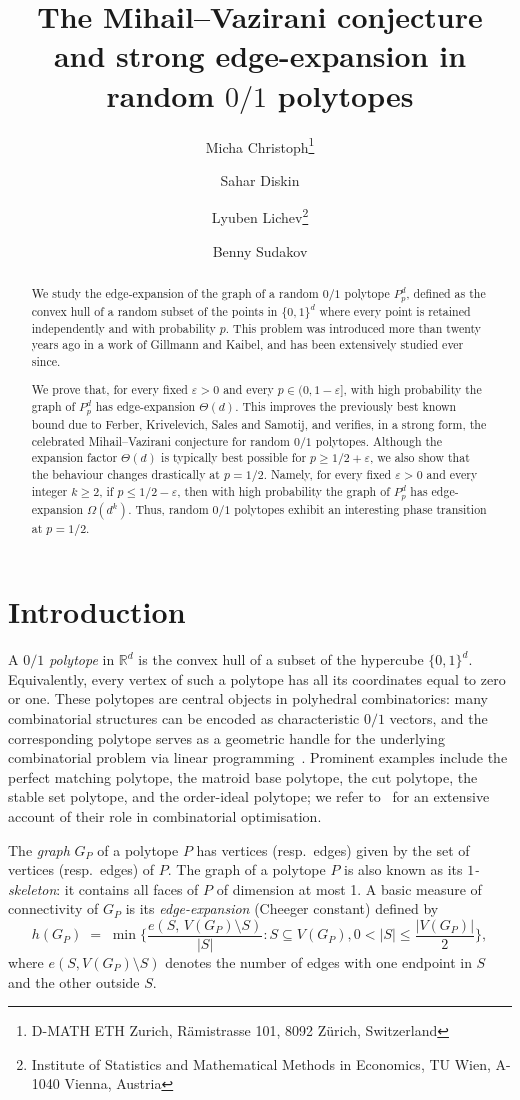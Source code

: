 \documentclass{article}
\title{The Mihail--Vazirani conjecture and strong edge-expansion in random $0/1$ polytopes}
\author{%
Micha Christoph\thanks{D-MATH ETH Zurich, R\"amistrasse 101, 8092 Z\"urich, Switzerland}
\and Sahar Diskin\footnotemark[1]
\and Lyuben Lichev\thanks{Institute of Statistics and Mathematical Methods in Economics, TU Wien, A-1040 Vienna, Austria}
\and Benny Sudakov\footnotemark[1]
}
\date{}
\theoremstyle{definition}
\newcommand{\eps}{\varepsilon}
\begin{document}
\maketitle

\begin{abstract}
We study the edge-expansion of the graph of a random $0/1$ polytope
$P^d_p$, defined as the convex hull of a random subset of the points in $\{0,1\}^d$ where every point is retained independently and with probability $p$.
This problem was introduced more than twenty years ago in a work of Gillmann and Kaibel, 
and has been extensively studied ever since.

We prove that, for every fixed $\eps>0$ and every $p\in(0,1-\eps]$, with high
probability the graph of $P^d_p$ has edge-expansion $\Theta(d)$. This improves the
previously best known bound due to Ferber, Krivelevich, Sales and Samotij, and
verifies, in a strong form, the celebrated Mihail--Vazirani conjecture for random
$0/1$ polytopes. Although the expansion factor $\Theta(d)$ is typically best
possible for $p\ge 1/2+\eps$, we also show that the behaviour changes drastically
at $p=1/2$. Namely, for every fixed $\eps>0$ and every integer $k\ge 2$, if
$p\le 1/2-\eps$, then with high probability the graph of $P^d_p$ has
edge-expansion $\Omega(d^k)$. Thus, random $0/1$ polytopes exhibit an interesting
phase transition at $p=1/2$.
\end{abstract}


\section{Introduction}
A \emph{$0/1$ polytope} in $\mathbb{R}^d$ is the convex hull of a subset of the
hypercube $\{0,1\}^d$.  Equivalently, every vertex of such a polytope has all
its coordinates equal to zero or one.  These polytopes are central objects in
polyhedral combinatorics: many combinatorial structures can be encoded as
characteristic $0/1$ vectors, and the corresponding polytope serves as a
geometric handle for the underlying combinatorial problem via linear
programming~\cite{Schrijver}.  Prominent examples include the perfect matching
polytope, the matroid base polytope, the cut polytope, the stable set polytope,
and the order-ideal polytope; we refer to~\cite{Schrijver} for an extensive
account of their role in combinatorial optimisation.
 
The \emph{graph} $G_P$ of a polytope $P$ has vertices (resp.\ edges) given by
the set of vertices (resp.\ edges) of $P$.
The graph of a polytope $P$ is also known as its \emph{$1$-skeleton}: it contains all faces of $P$ of dimension at most 1.
A basic measure of connectivity of $G_P$ is its
\emph{edge-expansion} (Cheeger constant) defined by 
\[
  h(G_P) \;=\; \min
  \bigg\{\frac{e(S,\, V(G_P)\setminus S)}{|S|}: S \subseteq V(G_P), 0 < |S| \le \frac{|V(G_P)|}{2}\bigg\},
\]
where $e(S, V(G_P)\setminus S)$ denotes the number of edges with one endpoint
in $S$ and the other outside $S$.
 
\end{document}

